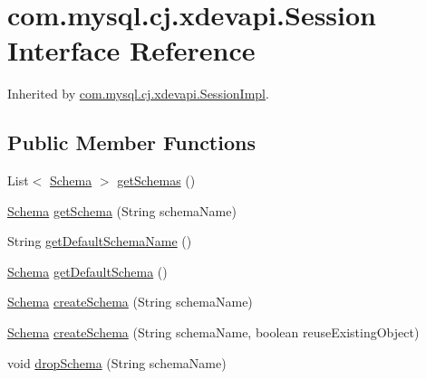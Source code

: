 \hypertarget{interfacecom_1_1mysql_1_1cj_1_1xdevapi_1_1_session}{}\section{com.\+mysql.\+cj.\+xdevapi.\+Session Interface Reference}
\label{interfacecom_1_1mysql_1_1cj_1_1xdevapi_1_1_session}


Inherited by \mbox{\hyperlink{classcom_1_1mysql_1_1cj_1_1xdevapi_1_1_session_impl}{com.\+mysql.\+cj.\+xdevapi.\+Session\+Impl}}.

\subsection*{Public Member Functions}
\begin{DoxyCompactItemize}
\item 
List$<$ \mbox{\hyperlink{interfacecom_1_1mysql_1_1cj_1_1xdevapi_1_1_schema}{Schema}} $>$ \mbox{\hyperlink{interfacecom_1_1mysql_1_1cj_1_1xdevapi_1_1_session_ac2c871a98ae18a178d73e76c89655ed3}{get\+Schemas}} ()
\item 
\mbox{\hyperlink{interfacecom_1_1mysql_1_1cj_1_1xdevapi_1_1_schema}{Schema}} \mbox{\hyperlink{interfacecom_1_1mysql_1_1cj_1_1xdevapi_1_1_session_a70703d4853bdfee2b32da36a27fa2e52}{get\+Schema}} (String schema\+Name)
\item 
String \mbox{\hyperlink{interfacecom_1_1mysql_1_1cj_1_1xdevapi_1_1_session_a9c612e7b080af6467b718dcaa3081a84}{get\+Default\+Schema\+Name}} ()
\item 
\mbox{\hyperlink{interfacecom_1_1mysql_1_1cj_1_1xdevapi_1_1_schema}{Schema}} \mbox{\hyperlink{interfacecom_1_1mysql_1_1cj_1_1xdevapi_1_1_session_a8ead4f7e01e906447c15d9e6ce38ead2}{get\+Default\+Schema}} ()
\item 
\mbox{\hyperlink{interfacecom_1_1mysql_1_1cj_1_1xdevapi_1_1_schema}{Schema}} \mbox{\hyperlink{interfacecom_1_1mysql_1_1cj_1_1xdevapi_1_1_session_a09866b1dd34b22cfc24ef9517387da9f}{create\+Schema}} (String schema\+Name)
\item 
\mbox{\hyperlink{interfacecom_1_1mysql_1_1cj_1_1xdevapi_1_1_schema}{Schema}} \mbox{\hyperlink{interfacecom_1_1mysql_1_1cj_1_1xdevapi_1_1_session_aef9311823fd5a36cba753a953f3613d3}{create\+Schema}} (String schema\+Name, boolean reuse\+Existing\+Object)
\item 
void \mbox{\hyperlink{interfacecom_1_1mysql_1_1cj_1_1xdevapi_1_1_session_af292b70a8b7a6a159e98d36a2729b0e7}{drop\+Schema}} (String schema\+Name)

\end{DoxyCompactItemize}
